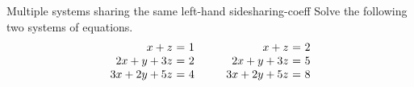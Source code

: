 \begin{example}{Multiple systems sharing the same left-hand side}{sharing-coeff}
  Solve the following two systems of equations.
  \begin{equation*}
    \begin{array}{r@{~}c@{~}l@{~}}
      x       +  z &=& 1 \\
      2x +  y + 3z &=& 2 \\
      3x + 2y + 5z &=& 4 \\
    \end{array}
    \quad\quad
    \begin{array}{r@{~}c@{~}l@{~}}
      x       +  z &=& 2 \\
      2x +  y + 3z &=& 5 \\
      3x + 2y + 5z &=& 8 \\
    \end{array}
  \end{equation*}
\end{example}

